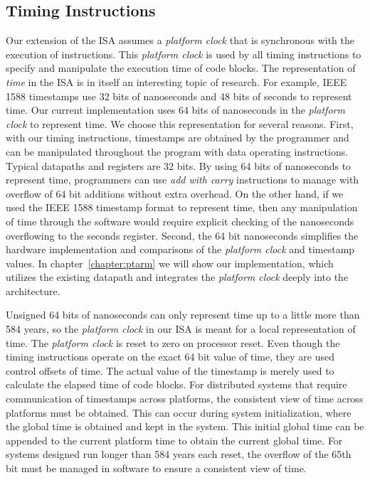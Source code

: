 \subsection{Timing Instructions}
Our extension of the ISA assumes a \emph{platform clock} that is synchronous with the execution of instructions.
This \emph{platform clock} is used by all timing instructions to specify and manipulate the execution time of code blocks.
The representation of \emph{time} in the ISA is in itself an interesting topic of research.
For example, IEEE 1588 timestamps use 32 bits of nanoseconds and 48 bits of seconds to represent time.    
Our current implementation uses 64 bits of nanoseconds in the \emph{platform clock} to represent time. 
We choose this representation for several reasons. 
First, with our timing instructions, timestamps are obtained by the programmer and can be manipulated throughout the program with data operating instructions.
Typical datapaths and registers are 32 bits. 
By using 64 bits of nanoseconds to represent time, programmers can use \emph{add with carry} instructions to manage with overflow of 64 bit additions without extra overhead. 
On the other hand, if we used the IEEE 1588 timestamp format to represent time, then any manipulation of time through the software would require explicit checking of the nanoseconds overflowing to the seconds register.
Second, the 64 bit nanoseconds simplifies the hardware implementation and comparisons of the \emph{platform clock} and timestamp values.
In chapter~\ref{chapter:ptarm} we will show our implementation, which utilizes the existing datapath and integrates the \emph{platform clock} deeply into the architecture. 

Unsigned 64 bits of nanoseconds can only represent time up to a little more than 584 years, so the \emph{platform clock} in our ISA is meant for a local representation of time. 
The \emph{platform clock} is reset to zero on processor reset. 
Even though the timing instructions operate on the exact 64 bit value of time, they are used control offsets of time. 
The actual value of the timestamp is merely used to calculate the elapsed time of code blocks.
For distributed systems that require communication of timestamps across platforms, the consistent view of time across platforms must be obtained.
This can occur during system initialization, where the global time is obtained and kept in the system.  
This initial global time can be appended to the current platform time to obtain the current global time. 
For systems designed run longer than 584 years each reset, the overflow of the 65th bit must be managed in software to ensure a consistent view of time.

